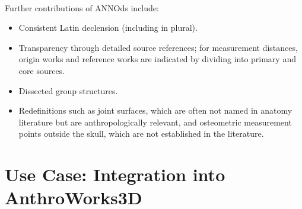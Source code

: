 \documentclass[sw]{iosart2x}
\newcommand{\aw}{AnthroWorks3D}
\begin{document}
\paragraph{}
Further contributions of ANNOds include:
\begin{itemize}
\item Consistent Latin declension (including in plural).
\item Transparency through detailed source references; for measurement distances, origin works and reference works are indicated by dividing into primary and core sources.
\item Dissected group structures.
\item Redefinitions such as joint surfaces, which are often not named in anatomy literature but are anthropologically relevant, and osteometric measurement points outside the skull, which are not established in the literature.
\end{itemize}

\section{Use Case: Integration into \aw{}}\label{sec:aw}
\end{document}
